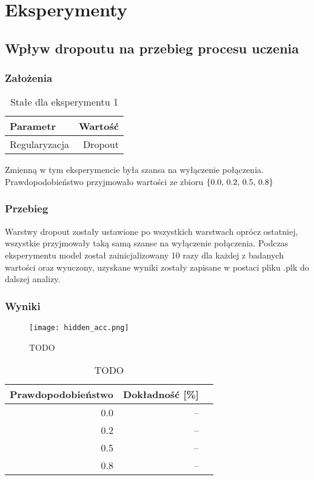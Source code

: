 \documentclass{article}
\begin{document}
\newpage
\section{Eksperymenty}

\subsection{Wpływ dropoutu na przebieg procesu uczenia}
\subsubsection*{Założenia}
\begin{table}[H]
	\caption{Stałe dla eksperymentu 1}
	\label{tabela-const-1}
	\centering
	\begin{tabular}{lr}
		\toprule
		Parametr      & Wartość \\
		\midrule
		Regularyzacja & Dropout   \\
		\bottomrule
	\end{tabular}
\end{table}

Zmienną w tym eksperymencie była szansa na wyłączenie połączenia. Prawdopodobieństwo przyjmowało wartości ze zbioru \(\{$0.0, 0.2, 0.5, 0.8$\}\)
\subsubsection*{Przebieg}

Warstwy dropout zostały ustawione po wszystkich warstwach oprócz ostatniej, wszystkie przyjmowały taką samą szanse na wyłączenie połączenia. Podczas eksperymentu model został zainicjalizowany 10 razy dla każdej z badanych wartości oraz wyuczony, uzyskane wyniki zostały zapisane w postaci pliku .plk do dalszej analizy.

\subsubsection*{Wyniki}
\begin{figure}[H]
	\centering
	\caption{TODO}
	\texttt{[image: hidden\_acc.png]}
	\label{fig:res11}
\end{figure}

\begin{table}[H]
	\caption{TODO}
	\label{tabela-res-11}
	\centering
	\begin{tabular}{rrr}
		\toprule
		Prawdopodobieństwo & Dokładność [\%] \\
		\midrule
		0.0                 & --                 \\
		0.2                 & --                 \\
		0.5                 & --                 \\
		0.8                 & --                 \\
		\bottomrule
	\end{tabular}
\end{table}
\end{document}
